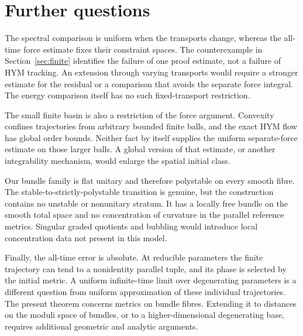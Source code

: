\section{Further questions}\label{sec:further}

The spectral comparison is uniform when the transports change,
whereas the all-time force estimate fixes their constraint spaces.
The counterexample in Section~\ref{sec:finite} identifies the
failure of one proof estimate, not a failure of HYM tracking.
An extension through varying transports would require a stronger
estimate for the residual or a comparison that avoids the separate
force integral. The energy comparison itself has no such
fixed-transport restriction.

The small finite basin is also a restriction of the force
argument. Convexity confines trajectories from arbitrary bounded
finite balls, and the exact HYM flow has global order bounds.
Neither fact by itself supplies the uniform separate-force
estimate on those larger balls. A global version of that estimate,
or another integrability mechanism, would enlarge the spatial
initial class.

Our bundle family is flat unitary and therefore polystable on
every smooth fibre. The stable-to-strictly-polystable transition
is genuine, but the construction contains no unstable or
nonunitary stratum. It has a locally free bundle on the smooth
total space and no concentration of curvature in the parallel
reference metrics. Singular graded quotients and bubbling would
introduce local concentration data not present in this model.

Finally, the all-time error is absolute. At reducible parameters
the finite trajectory can tend to a nonidentity parallel tuple,
and its phase is selected by the initial metric. A uniform
infinite-time limit over degenerating parameters is a different
question from uniform approximation of these individual
trajectories. The present theorem concerns metrics on bundle
fibres. Extending it to distances on the moduli space of bundles,
or to a higher-dimensional degenerating base, requires additional
geometric and analytic arguments.
